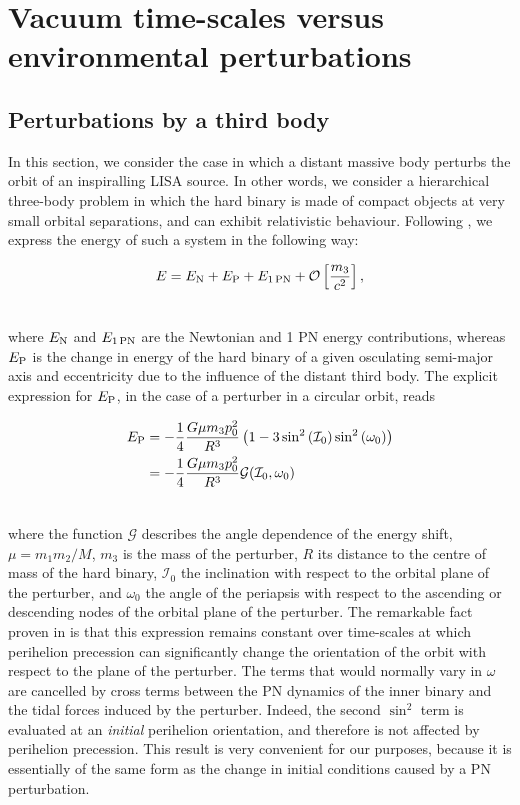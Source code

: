\documentclass[usenatbib]{mnras}
\begin{document}
\section{Vacuum time-scales versus environmental perturbations} \label{sec:environment}

\subsection{Perturbations by a third body}

In this section, we consider the case in which a distant massive body perturbs the orbit of an inspiralling LISA source. In other words, we consider a hierarchical three-body problem in which the hard binary is made of compact objects at very small orbital separations, and can exhibit relativistic behaviour. Following \cite{Will_KL}, we express the energy of such a system in the following way:

\begin{align}
    E = E_{\rm N} + E_{\rm{P}} + E_{\rm{1\,PN}} + \mathcal{O}\left[\frac{m_3}{c^2}\right],\\ \nonumber
\end{align}

\noindent where $E_{\rm N}$ and $E_{\rm{1\,PN}}$ are the Newtonian and 1 PN energy contributions, whereas $E_{\rm{P}}$ is the change in energy of the hard binary of a given osculating semi-major axis and eccentricity due to the influence of the distant third body. The explicit expression for $E_{\rm{P}}$, in the case of a perturber in a circular orbit, reads

\begin{align}
   E_{\rm{P}} &= -\frac{1}{4} \frac{G \mu m_{ 3} p_{0}^2}{R^3}\left(1 -3 \sin^2 \left( \mathcal{I}_0 \right) \sin^2 \left( \omega_0 \right) \right) \nonumber \\
   &= -\frac{1}{4} \frac{G \mu m_{ 3} p_{0}^2}{R^3} \mathcal{G}(\mathcal{I}_0,\omega_0) \\ \nonumber
\end{align}

\noindent where the function $\mathcal{G}$ describes the angle dependence of the energy shift, $\mu = m_1m_2/M$, $m_3$ is the mass of the perturber, $R$ its distance to the centre of mass of the hard binary, $\mathcal{I}_0$ the inclination with respect to the orbital plane of the perturber, and $\omega_0$ the angle of the periapsis with respect to the ascending or descending nodes of the orbital plane of the perturber. The remarkable fact proven in \cite{Will_KL} is that this expression remains constant over time-scales at which perihelion precession can significantly change the orientation of the orbit with respect to the plane of the perturber. The terms that would normally vary in $\omega$ are cancelled by cross terms between the PN dynamics of the inner binary and the tidal forces induced by the perturber. Indeed, the second $\sin^2$ term is evaluated at an \textit{initial} perihelion orientation, and therefore is not affected by perihelion precession. This result is very convenient for our purposes, because it is essentially of the same form as the change in initial conditions caused by a PN perturbation.
\end{document}
